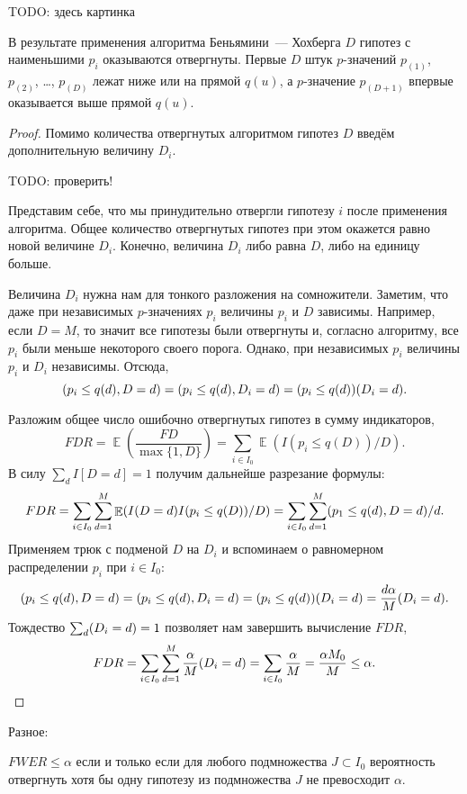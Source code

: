 \documentclass[12pt]{article}
\let\P\relax
\DeclareMathOperator{\P}{\mathbb{P}}
\DeclareMathOperator{\E}{\mathbb{E}}
\begin{document}
TODO: здесь картинка

В результате применения алгоритма Беньямини~— Хохберга $D$ гипотез с наименьшими $p_i$ оказываются отвергнуты. 
Первые $D$ штук $p$-значений $p_{(1)}$, $p_{(2)}$, \dots, $p_{(D)}$ лежат ниже или на прямой $q(u)$, 
а $p$-значение $p_{(D+1)}$ впервые оказывается выше прямой $q(u)$.


\begin{proof}
Помимо количества отвергнутых алгоритмом гипотез $D$ введём дополнительную величину $D_i$.

TODO: проверить!

Представим себе, что мы принудительно отвергли гипотезу $i$ после применения алгоритма. 
Общее количество отвергнутых гипотез при этом окажется равно новой величине $D_i$. 
Конечно, величина $D_i$ либо равна $D$, либо на единицу больше. 

Величина $D_i$ нужна нам для тонкого разложения на сомножители. 
Заметим, что даже при независимых $p$-значениях $p_i$ величины $p_i$ и $D$ зависимы. 
Например, если $D = M$, то значит все гипотезы были отвергнуты и, согласно алгоритму, все $p_i$ были меньше некоторого своего порога. 
Однако, при независимых $p_i$ величины $p_i$ и $D_i$ независимы. 
Отсюда, 
\[
\P(p_i \leq q(d), D = d) = \P(p_i \leq q(d), D_i = d) = \P(p_i \leq q(d)) \P(D_i = d).
\]

Разложим общее число ошибочно отвергнутых гипотез в сумму индикаторов,
\[
FDR = \E\left( \frac{FD}{\max\{1, D\} }\right) = \sum_{i \in I_0} \E(I(p_i \leq q(D)) / D).
\]
В силу $\sum_d I[D = d] = 1$ получим дальнейше разрезание формулы:
\[
    FDR = \sum_{i \in I_0} \sum_{d=1}^M \E(I(D = d) I(p_i \leq q(D)) / D) = \sum_{i \in I_0}\sum_{d=1}^M \P(p_1 \leq q(d), D= d) / d.
\]
Применяем трюк с подменой $D$ на $D_i$ и вспоминаем о равномерном распределении $p_i$ при $i \in I_0$:
\[
    \P(p_i \leq q(d), D = d) = \P(p_i \leq q(d), D_i = d) = \P(p_i \leq q(d)) \P(D_i = d) = \frac{d \alpha}{M} \P(D_i = d).
\]
Тождество $\sum_d \P(D_i = d) = 1$ позволяет нам завершить вычисление $FDR$, 
\[
FDR = \sum_{i \in I_0} \sum_{d=1}^M \frac{\alpha}{M} \P(D_i = d) = \sum_{i \in I_0} \frac{\alpha}{M} = \frac{\alpha M_0}{M} \leq \alpha.
\]
\end{proof}



Разное:

$FWER \leq \alpha$ если и только если для любого подмножества $J \subset I_0$ вероятность отвергнуть хотя бы одну 
гипотезу из подмножества $J$ не превосходит $\alpha$. 
\end{document}
